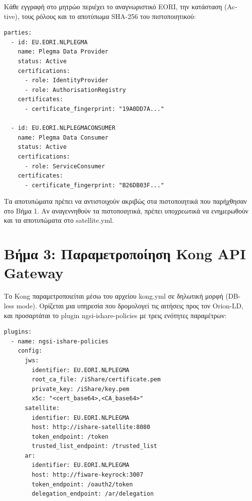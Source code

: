 Κάθε εγγραφή στο μητρώο περιέχει το αναγνωριστικό \textlatin{EORI},
την κατάσταση (\textlatin{Active}), τους ρόλους και το αποτύπωμα
\textlatin{SHA-256} του πιστοποιητικού:

\begin{lstlisting}[language={}, caption={Excerpt of satellite.yml for participant registration.}]
parties:
  - id: EU.EORI.NLPLEGMA
    name: Plegma Data Provider
    status: Active
    certifications:
      - role: IdentityProvider
      - role: AuthorisationRegistry
    certificates:
      - certificate_fingerprint: "19A0DD7A..."

  - id: EU.EORI.NLPLEGMACONSUMER
    name: Plegma Data Consumer
    status: Active
    certifications:
      - role: ServiceConsumer
    certificates:
      - certificate_fingerprint: "B26DB03F..."
\end{lstlisting}

Τα αποτυπώματα πρέπει να αντιστοιχούν ακριβώς στα πιστοποιητικά που
παρήχθησαν στο Βήμα 1. Αν αναγεννηθούν τα πιστοποιητικά, πρέπει
υποχρεωτικά να ενημερωθούν και τα αποτυπώματα στο
\textlatin{satellite.yml}.

\section{Βήμα 3: Παραμετροποίηση \textlatin{Kong API Gateway}}
\label{sec:step3-kong}

Το \textlatin{Kong} παραμετροποιείται μέσω του αρχείου
\textlatin{kong.yml} σε δηλωτική μορφή (\textlatin{DB-less mode}).
Ορίζεται μια υπηρεσία που δρομολογεί τις αιτήσεις προς τον
\textlatin{Orion-LD}, και προσαρτάται το \textlatin{plugin}
\textlatin{ngsi-ishare-policies} με τρεις ενότητες παραμέτρων:

\begin{lstlisting}[language={}, caption={Excerpt of kong.yml -- plugin configuration.}]
plugins:
  - name: ngsi-ishare-policies
    config:
      jws:
        identifier: EU.EORI.NLPLEGMA
        root_ca_file: /iShare/certificate.pem
        private_key: /iShare/key.pem
        x5c: "<cert_base64>,<CA_base64>"
      satellite:
        identifier: EU.EORI.NLPLEGMA
        host: http://ishare-satellite:8080
        token_endpoint: /token
        trusted_list_endpoint: /trusted_list
      ar:
        identifier: EU.EORI.NLPLEGMA
        host: http://fiware-keyrock:3007
        token_endpoint: /oauth2/token
        delegation_endpoint: /ar/delegation
\end{lstlisting}

